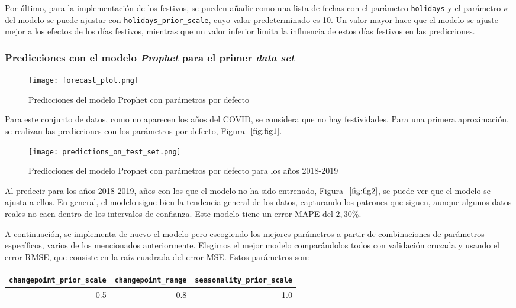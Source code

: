 \documentclass[12pt,twoside]{article}
\begin{document}
Por último, para la implementación de los festivos, se pueden añadir como una lista de fechas con el parámetro \texttt{holidays} y el parámetro $\kappa$ del modelo se puede ajustar con \texttt{holidays\_prior\_scale}, cuyo valor predeterminado es 10. Un valor mayor hace que el modelo se ajuste mejor a los efectos de los días festivos, mientras que un valor inferior limita la influencia de estos días festivos en las predicciones.

\subsubsection{Predicciones con el modelo \textit{Prophet} para el primer \textit{data set}}\label{sec:8}

\begin{figure}[h]
    \centering
    \texttt{[image: forecast\_plot.png]}
    \caption{Predicciones del modelo Prophet con parámetros por defecto} 
    \label{fig:fig1}
\end{figure}

Para este conjunto de datos, como no aparecen los años del COVID, se considera que no hay festividades. Para una primera aproximación, se realizan las predicciones con los parámetros por defecto, Figura $~\ref{fig:fig1}$.

\begin{figure}[h]
    \centering
    \texttt{[image: predictions\_on\_test\_set.png]}
    \caption{Predicciones del modelo Prophet con parámetros por defecto para los años 2018-2019} 
    \label{fig:fig2}
\end{figure}

Al predecir para los años 2018-2019, años con los que el modelo no ha sido entrenado, Figura $~\ref{fig:fig2}$, se puede ver que el modelo se ajusta a ellos. En general, el modelo sigue bien la tendencia general de los datos, capturando los patrones que siguen, aunque algunos datos reales no caen dentro de los intervalos de confianza. Este modelo tiene un error MAPE del $2,30\%$.

A continuación, se implementa de nuevo el modelo pero escogiendo los mejores parámetros a partir de combinaciones de parámetros específicos, varios de los mencionados anteriormente. Elegimos el mejor modelo comparándolos todos con validación cruzada y usando el error RMSE, que consiste en la raíz cuadrada del error MSE. Estos parámetros son: 

\begin{table}[ht] 
\centering
\begin{tabular}{rrr} 
  \hline
 \texttt{changepoint\_prior\_scale} & \texttt{changepoint\_range} & \texttt{seasonality\_prior\_scale} \\ 
  \hline
0.5 & 0.8 & 1.0 \\ 
   \hline
\end{tabular}
\end{table}
\end{document}
